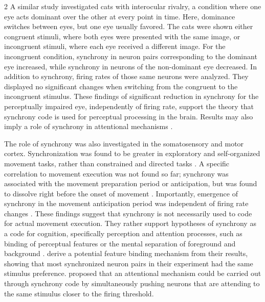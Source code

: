\documentclass[12pt,a4paper]{article}
\begin{document}
\begin{multicols}{2}
            A similar study investigated cats with interocular rivalry, a condition where one eye acts dominant over the other at every point in time. Here, dominance switches between eyes, but one eye usually favored. The cats were shown either congruent stimuli, where both eyes were presented with the same image, or incongruent stimuli, where each eye received a different image. For the incongruent condition, synchrony in neuron pairs corresponding to the dominant eye increased, while synchrony in neurons of the non-dominant eye decreased. In addition to synchrony, firing rates of those same neurons were analyzed. They displayed no significant changes when switching from the congruent to the incongruent stimulus. These findings of significant reduction in synchrony for the perceptually impaired eye, independently of firing rate, support the theory that synchrony code is used for perceptual processing in the brain. Results may also imply a role of synchrony in attentional mechanisms \cite{ZB}.

            The role of synchrony was also investigated in the somatosensory and motor cortex. Synchronization was found to be greater in exploratory and self-organized movement tasks, rather than constrained and directed tasks \cite{ZC}. A specific correlation to movement execution was not found so far; synchrony was associated with the movement preparation period or anticipation, but was found to dissolve right before the onset of movement \cite{ZC, ZE, ZF}. Importantly, emergence of synchrony in the movement anticipation period was independent of firing rate changes \cite{ZE}. These findings suggest that synchrony is not necessarily used to code for actual movement execution. They rather support hypotheses of synchrony as a code for cognition, specifically perception and attention processes, such as binding of perceptual features or the mental separation of foreground and background \cite{ZC, ZE, ZF}. \textcite{ZF} derive a potential feature binding mechanism from their results, showing that most synchronized neuron pairs in their experiment had the same stimulus preference. \textcite{ZC} proposed that an attentional mechanism could be carried out through synchrony code by simultaneously pushing neurons that are attending to the same stimulus closer to the firing threshold.


\end{multicols}
\end{document}

